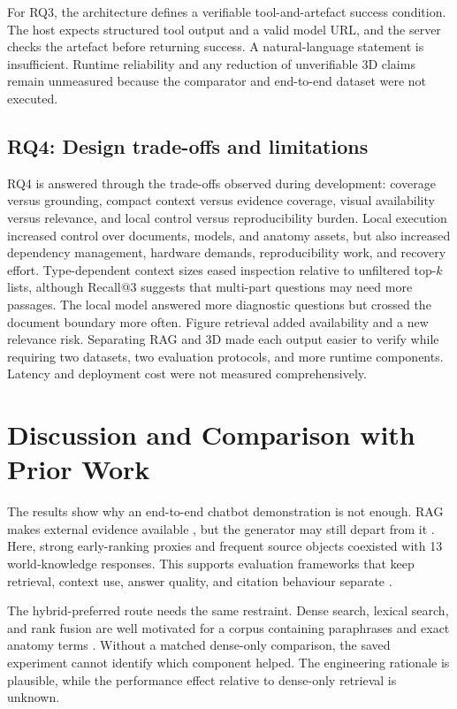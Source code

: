 For RQ3, the \MCP{} architecture defines a verifiable tool-and-artefact success condition. The host expects structured tool output and a valid model URL, and the server checks the artefact before returning success. A natural-language statement is insufficient. Runtime reliability and any reduction of unverifiable 3D claims remain unmeasured because the comparator and end-to-end dataset were not executed.

\subsection{RQ4: Design trade-offs and limitations}
\label{subsec:rq4-answer}

RQ4 is answered through the trade-offs observed during development: coverage versus grounding, compact context versus evidence coverage, visual availability versus relevance, and local control versus reproducibility burden. Local execution increased control over documents, models, and anatomy assets, but also increased dependency management, hardware demands, reproducibility work, and recovery effort. Type-dependent context sizes eased inspection relative to unfiltered top-$k$ lists, although Recall@3 suggests that multi-part questions may need more passages. The local model answered more diagnostic questions but crossed the document boundary more often. Figure retrieval added availability and a new relevance risk. Separating RAG and 3D made each output easier to verify while requiring two datasets, two evaluation protocols, and more runtime components. Latency and deployment cost were not measured comprehensively.

\section{Discussion and Comparison with Prior Work}
\label{sec:discussion-prior-work}

The results show why an end-to-end chatbot demonstration is not enough. RAG makes external evidence available \parencite{lewis2020}, but the generator may still depart from it \parencite{ji2023}. Here, strong early-ranking proxies and frequent source objects coexisted with 13 world-knowledge responses. This supports evaluation frameworks that keep retrieval, context use, answer quality, and citation behaviour separate \parencite{es2024ragas}.

The hybrid-preferred route needs the same restraint. Dense search, lexical search, and rank fusion are well motivated for a corpus containing paraphrases and exact anatomy terms \parencite{karpukhin2020,reimers2019,robertson2009,cormack2009}. Without a matched dense-only comparison, the saved experiment cannot identify which component helped. The engineering rationale is plausible, while the performance effect relative to dense-only retrieval is unknown.

